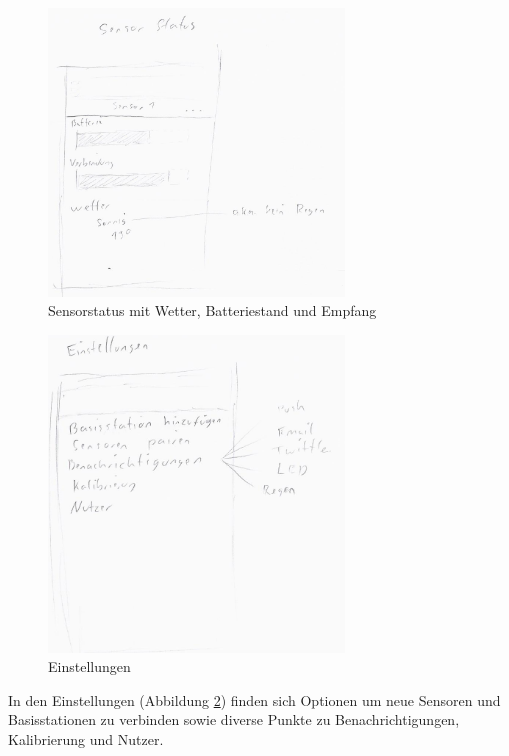 \begin{figure}[htb] 
	\centerline{\includegraphics*[width=0.7\textwidth]{./Designs/AppGUIConcept_sensorStatus}}
	\caption{Sensorstatus mit Wetter, Batteriestand und Empfang}
	\label{gui_sensor_status}
\end{figure}
\begin{figure}[htb] 
	\centerline{\includegraphics*[width=0.7\textwidth]{./Designs/AppGUIConcept_settings}}
	\caption{Einstellungen}
	\label{gui_settings}
\end{figure}
In den Einstellungen (Abbildung \ref{gui_settings}) finden sich Optionen um neue Sensoren und Basisstationen zu verbinden sowie diverse Punkte zu Benachrichtigungen, Kalibrierung und Nutzer.